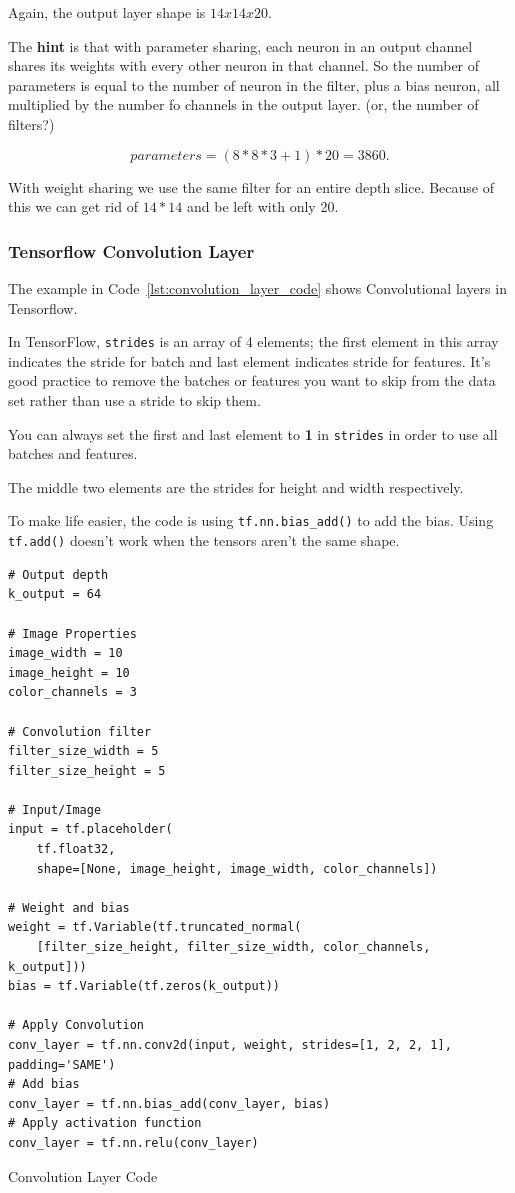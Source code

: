 \documentclass[11pt, a4paper]{article}
\begin{document}
Again, the output layer shape is $14x14x20$.

The \textbf{hint} is that with parameter sharing, each neuron in an output channel shares its weights with every other neuron in that channel. So the number of parameters is equal to the number of neuron in the filter, plus a bias neuron, all multiplied by the number fo channels in the output layer. (or, the number of filters?)

\[
 parameters = (8 * 8 * 3 + 1 ) * 20 = 3860 
.\] 

With weight sharing we use the same filter for an entire depth slice. Because of this we can get rid of $14 * 14$ and be left with only 20.




\subsubsection{Tensorflow Convolution Layer}%
\label{ssub:tensorflow_convolution_layer}

The example in Code~\ref{lst:convolution_layer_code} shows Convolutional layers in Tensorflow.

In TensorFlow, \texttt{strides} is an array of 4 elements; the first element in this array indicates the stride for batch and last element indicates stride for features. It's good practice to remove the batches or features you want to skip from the data set rather than use a stride to skip them. 

You can always set the first and last element to \textbf{1} in \texttt{strides} in order to use all batches and features.

The middle two elements are the strides for height and width respectively.


To make life easier, the code is using \texttt{tf.nn.bias\_add()} to add the bias. Using \texttt{tf.add()} doesn't work when the tensors aren't the same shape.


\begin{listing}
\begin{verbatim}
# Output depth
k_output = 64

# Image Properties
image_width = 10
image_height = 10
color_channels = 3

# Convolution filter
filter_size_width = 5
filter_size_height = 5

# Input/Image
input = tf.placeholder(
    tf.float32,
    shape=[None, image_height, image_width, color_channels])

# Weight and bias
weight = tf.Variable(tf.truncated_normal(
    [filter_size_height, filter_size_width, color_channels, k_output]))
bias = tf.Variable(tf.zeros(k_output))

# Apply Convolution
conv_layer = tf.nn.conv2d(input, weight, strides=[1, 2, 2, 1], 
padding='SAME')
# Add bias
conv_layer = tf.nn.bias_add(conv_layer, bias)
# Apply activation function
conv_layer = tf.nn.relu(conv_layer)
\end{verbatim}
\caption{Convolution Layer Code}
\label{lst:convolution_layer_code}
\end{listing}
\end{document}
